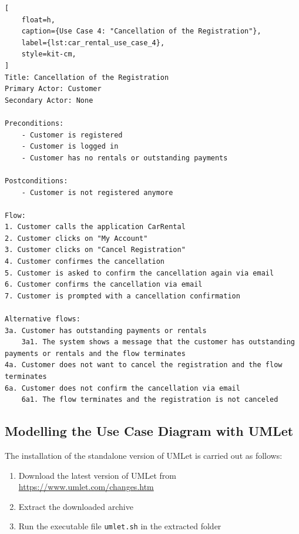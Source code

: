 \begin{lstlisting}[
    float=h,
    caption={Use Case 4: "Cancellation of the Registration"},
    label={lst:car_rental_use_case_4},
    style=kit-cm,
]
Title: Cancellation of the Registration
Primary Actor: Customer
Secondary Actor: None

Preconditions:
    - Customer is registered
    - Customer is logged in
    - Customer has no rentals or outstanding payments

Postconditions:
    - Customer is not registered anymore

Flow:
1. Customer calls the application CarRental
2. Customer clicks on "My Account"
3. Customer clicks on "Cancel Registration"
4. Customer confirmes the cancellation
5. Customer is asked to confirm the cancellation again via email
6. Customer confirms the cancellation via email
7. Customer is prompted with a cancellation confirmation

Alternative flows:
3a. Customer has outstanding payments or rentals
    3a1. The system shows a message that the customer has outstanding payments or rentals and the flow terminates
4a. Customer does not want to cancel the registration and the flow terminates
6a. Customer does not confirm the cancellation via email
    6a1. The flow terminates and the registration is not canceled
\end{lstlisting}

\subsection*{Modelling the Use Case Diagram with UMLet}
The installation of the standalone version of UMLet is carried out as follows:
\begin{enumerate}
    \item Download the latest version of UMLet from \url{https://www.umlet.com/changes.htm}
    \item Extract the downloaded archive
    \item Run the executable file \texttt{umlet.sh} in the extracted folder
\end{enumerate}

